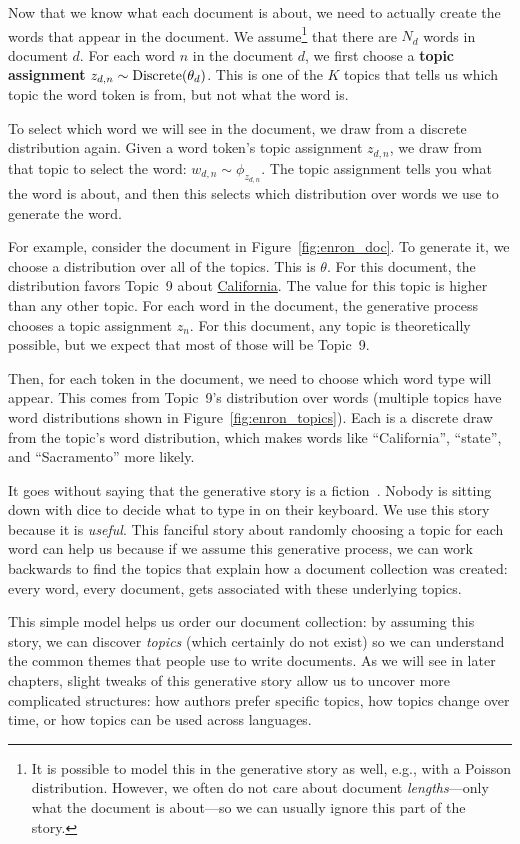 Now that we know what each document is about, we need to actually create the
words that appear in the document.  We assume\footnote{It is possible to model
  this in the generative story as well, e.g., with a Poisson distribution.
  However, we often do not care about document \emph{lengths}---only what the
  document is about---so we can usually ignore this part of the story.} that
there are $N_d$ words in document $d$.  For each word $n$ in the
document $d$, we first choose a {\bf topic assignment} $z_{d,n} \sim
\mbox{Discrete}( \theta_d)$.  This is one of the $K$ topics that tells us which topic the
word token is from, but not what the word is.

To select which word we will see in the document, we draw from a discrete
distribution again.  Given a word token's topic assignment $z_{d,n}$, we draw from that
topic to select the word: $w_{d,n} \sim \phi_{z_{d,n}}$.  The topic assignment
tells you what the word is about, and then this selects which distribution over
words we use to generate the word.  %

For example, consider the document in Figure~\ref{fig:enron_doc}.  To
generate it, we choose a distribution over all of the topics.  This is
$\theta$.  For this document, the distribution favors Topic~9 about
\underline{California}.  The value for this topic is higher than any other topic.  For
each word in the document, the generative process chooses a topic
assignment $z_n$.  For this document, any topic is theoretically possible, but we expect that most of those will be Topic~9.

Then, for each token in the document, we need to choose which word type will appear.  This
comes from Topic~9's distribution over words (multiple topics have
word distributions shown in Figure~\ref{fig:enron_topics}).  Each is a
discrete draw from the topic's word distribution, which makes words
like ``California'', ``state'', and ``Sacramento'' more likely.

It goes without saying that the generative story is a fiction~\citep{box-87}.
Nobody is sitting down with dice to decide what to type in on their keyboard.
We use this story because it is \emph{useful}.  This fanciful story about randomly
choosing a topic for each word can help us because if we assume this generative
process, we can work backwards to find the topics that explain how a document
collection was created: every word, every document, gets associated with these
underlying topics.

This simple model helps us order our document collection: by assuming this story, we
can discover \emph{topics} (which certainly do not exist) so we can understand
the common themes that people use to write documents.  As we will see in later
chapters, slight tweaks of this generative story allow us to uncover more
complicated structures: how authors prefer specific topics, how topics change
over time, or how topics can be used across languages.

